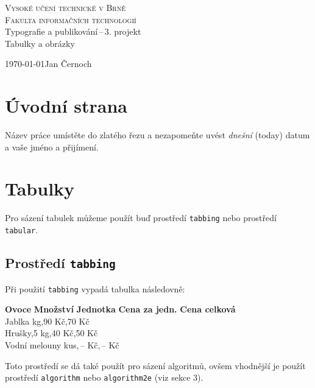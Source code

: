 \documentclass[a4paper,11pt]{article}
\begin{document}
    \begin{titlepage}
        \begin{center}
            \textsc{\Huge{Vysoké učení technické v Brně}} \\
            \vspace{0.5 em}
            \textsc{\huge{Fakulta informačních technologií}} \\
            \LARGE{Typografie a publikování\,--\,3. projekt} \\
            \Huge{Tabulky a obrázky}
        \end{center}
        \Large{\today \hfill Jan Černoch}
    \end{titlepage}

\section{Úvodní strana}
Název práce umístěte do zlatého řezu a nezapomeňte uvést \textit{dnešní} (today) datum a vaše jméno a přijímení.

\section{Tabulky}
Pro sázení tabulek můžeme použít buď prostředí \verb|tabbing| nebo prostředí \verb|tabular|.

\subsection{Prostředí \texttt{tabbing}}

Při použití \verb|tabbing| vypadá tabulka následovně:
\begin{tabbing}
    \textbf{Ovoce} \hspace{1,5cm} \= \textbf{Množství} \hspace{0,3cm} \= \textbf{Jednotka} \hspace{0,3cm} \= \textbf{Cena za jedn.} \hspace{0,5cm} \= \textbf{Cena celková} \= \\
    Jablka\>     kg,90 Kč,70 Kč\\
    Hrušky,5\>   kg,40 Kč,50 Kč\\
    Vodní melouny\>     kus,\,-- Kč,\,-- Kč\\
\end{tabbing}
Toto prostředí se dá také použít pro sázení algoritmů, ovšem vhodnější je použít prostředí \verb|algorithm| nebo \verb|algorithm2e| (viz sekce 3).
\end{document}
